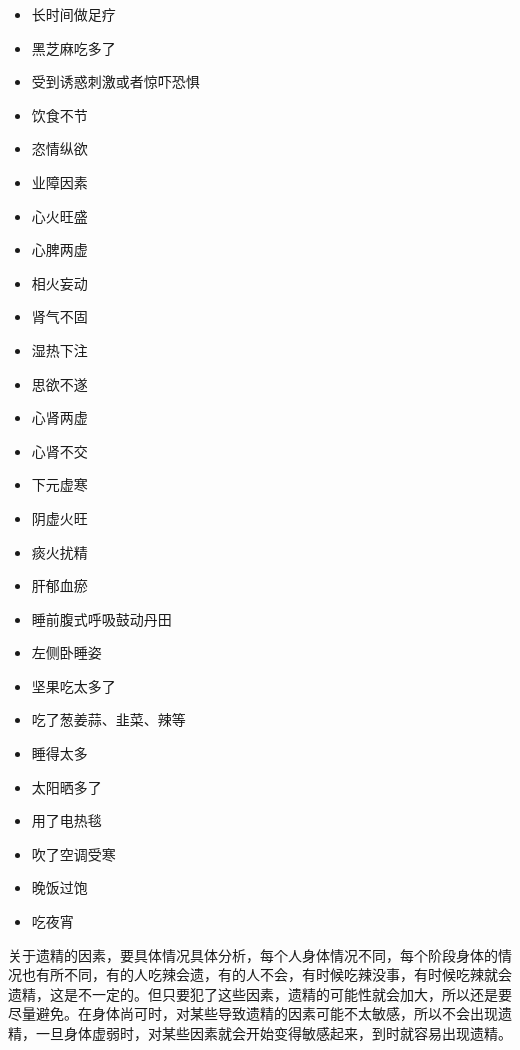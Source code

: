 \begin{multicols}{3}
\begin{itemize}
        \item 长时间做足疗
        \item 黑芝麻吃多了
        \item 受到诱惑刺激或者惊吓恐惧
        \item 饮食不节
        \item 恣情纵欲
        \item 业障因素
        \item 心火旺盛
        \item 心脾两虚
        \item 相火妄动
        \item 肾气不固
        \item 湿热下注
        \item 思欲不遂
        \item 心肾两虚
        \item 心肾不交
        \item 下元虚寒
        \item 阴虚火旺
        \item 痰火扰精
        \item 肝郁血瘀
        \item 睡前腹式呼吸鼓动丹田
        \item 左侧卧睡姿
        \item 坚果吃太多了
        \item 吃了葱姜蒜、韭菜、辣等
        \item 睡得太多
        \item 太阳晒多了
        \item 用了电热毯
        \item 吹了空调受寒
        \item 晚饭过饱
        \item 吃夜宵
    \end{itemize}
\end{multicols}

关于遗精的因素，要具体情况具体分析，每个人身体情况不同，每个阶段身体的情况也有所不同，有的人吃辣会遗，有的人不会，有时候吃辣没事，有时候吃辣就会遗精，这是不一定的。但只要犯了这些因素，遗精的可能性就会加大，所以还是要尽量避免。在身体尚可时，对某些导致遗精的因素可能不太敏感，所以不会出现遗精，一旦身体虚弱时，对某些因素就会开始变得敏感起来，到时就容易出现遗精。

